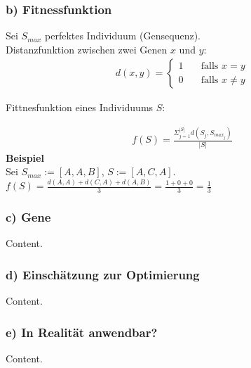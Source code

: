 \documentclass{beamer}
\begin{document}
\begin{frame}
  \frametitle{\textbf{b)} Fitnessfunktion}

  Sei $S_{max}$ perfektes Individuum (Gensequenz). \\

  Distanzfunktion zwischen zwei Genen $x$ und $y$:
  \begin{align*}
    d(x,y) =
      \begin{cases}
        1 & \quad \text{falls } x = y \\
        0 & \quad \text{falls } x \neq y
      \end{cases}
  \end{align*}

  Fittnesfunktion eines Individuums $S$:

  \begin{align*}
    f(S) = \frac{\Sigma_{j=1}^{|S|} d(S_{j},S_{max_j})}
                {|S|}
  \end{align*}
  \textbf{Beispiel} \\
    \vspace{0.5cm}
    Sei $S_{max} := [ A, A, B ]$, $S := [A, C, A]$. \\
    \vspace{0.5cm}
    $f(S) = \frac{d(A,A) + d(C, A) + d(A, B)}{3}
           = \frac{1 + 0 + 0}{3} = \frac{1}{3}$
\end{frame}

\begin{frame}
  \frametitle{\textbf{c)} Gene}
  Content.
\end{frame}

\begin{frame}
  \frametitle{\textbf{d)} Einsch\"atzung zur Optimierung}
  Content.
\end{frame}

\begin{frame}
  \frametitle{\textbf{e)} In Realit\"at anwendbar?}
  Content.
\end{frame}
\end{document}
